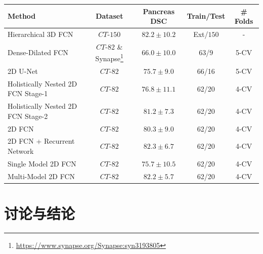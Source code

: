 \documentclass{article}
\begin{document}
\begin{table}\footnotesize
	\parbox{\textwidth}{
		\centering
		\label{tab:state_of_the_art_methods}
		\vspace{1 mm}
		\begin{tabular}{@{\extracolsep{1pt}}lcccc@{}} 
			Method  & Dataset & Pancreas DSC & Train/Test & \# Folds \\ \midrule
			
			Hierarchical 3D FCN \cite{roth2017hierarchical} & $CT$-$150$ & $82.2\pm10.2$ & Ext/$150$ & -\\
			
			Dense-Dilated FCN \cite{gibson2017towards} & $CT$-$82$ \& Synapse\footnote{\url{https://www.synapse.org/Synapse:syn3193805}} & $66.0\pm10.0$ & $63$/$9$ & 5-CV\\
			
			2D U-Net \cite{heinrich2018ternarynet} & $CT$-$82$ & $75.7\pm9.0$ & 66/16 & 5-CV\\ 
			
			Holistically Nested 2D FCN Stage-1\cite{roth2018media} & $CT$-$82$ & $76.8 \pm 11.1$ & 62/20& 4-CV\\
			
			Holistically Nested 2D FCN Stage-2\cite{roth2018media} & $CT$-$82$ & $81.2 \pm 7.3$ & 62/20& 4-CV\\
			
			2D FCN \cite{cai2017improving} & $CT$-$82$ & $80.3\pm9.0$ & 62/20 & 4-CV\\
			
			2D FCN + Recurrent Network \cite{cai2017improving} & $CT$-$82$ & $82.3 \pm 6.7$ & 62/20 & 4-CV\\
			
			Single Model 2D FCN \cite{zhou2017fixed} & $CT$-$82$ & $75.7 \pm 10.5$ & 62/20 & 4-CV\\
			
			Multi-Model 2D FCN \cite{zhou2017fixed} & $CT$-$82$ & $82.2 \pm 5.7$ & 62/20 & 4-CV\\
			
			\midrule
		\end{tabular}
	}
\end{table}

\section{讨论与结论}
\end{document}
